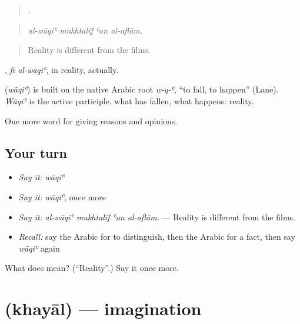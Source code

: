 \begin{quote}
   .
\end{quote}

\begin{quote}
\emph{al-wāqiʿ mukhtalif ʿan al-aflām.}
\end{quote}

\begin{quote}
Reality is different from the films.
\end{quote}

 , \emph{fī al-wāqiʿ}, in reality, actually.

\begin{cousinweb}
\textbf{} (\emph{wāqiʿ}) is built on the native Arabic root \emph{w-q-ʿ}, \textquotedblleft{}to fall, to happen\textquotedblright{} (Lane). \emph{Wāqiʿ} is the active participle, what has fallen, what happens: reality.
\end{cousinweb}

\begin{grammarlens}[title={What you've built}]
One more word for giving reasons and opinions.
\end{grammarlens}

\subsection*{Your turn}
\begin{itemize}
\raggedright
  \item \emph{Say it:} \emph{wāqiʿ}
  \item \emph{Say it:} \emph{wāqiʿ}, once more
  \item \emph{Say it:} \emph{al-wāqiʿ mukhtalif ʿan al-aflām.} — Reality is different from the films.
  \item \emph{Recall:} say the Arabic for to distinguish, then the Arabic for a fact, then say \emph{wāqiʿ} again
\end{itemize}

\begin{tcolorbox}[breakable,colback=teal!4,colframe=teal!35!black,title={Before you move on}]
What does  mean? (\textquotedblleft{}Reality\textquotedblright{}.) Say it once more.
\end{tcolorbox}
\section[\texorpdfstring{\ar{خيال} (khayāl)}{خيال (khayāl)}]{ (khayāl) — imagination}

